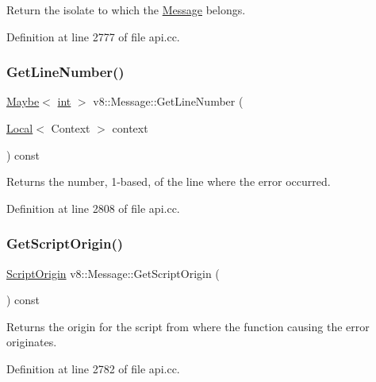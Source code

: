 Return the isolate to which the \mbox{\hyperlink{classv8_1_1Message}{Message}} belongs. 

Definition at line 2777 of file api.\+cc.

\mbox{\label{classv8_1_1Message_aa274b764af674e656346c42d15aac691}} 
\subsubsection{\texorpdfstring{Get\+Line\+Number()}{GetLineNumber()}}
{\footnotesize\ttfamily \mbox{\hyperlink{classv8_1_1Maybe}{Maybe}}$<$ \mbox{\hyperlink{classint}{int}} $>$ v8\+::\+Message\+::\+Get\+Line\+Number (\begin{DoxyParamCaption}\item[{\mbox{\hyperlink{classv8_1_1Local}{Local}}$<$ Context $>$}]{context }\end{DoxyParamCaption}) const}

Returns the number, 1-\/based, of the line where the error occurred. 

Definition at line 2808 of file api.\+cc.

\mbox{\label{classv8_1_1Message_a3530ffb45b802c46a47349e610402a3c}} 
\subsubsection{\texorpdfstring{Get\+Script\+Origin()}{GetScriptOrigin()}}
{\footnotesize\ttfamily \mbox{\hyperlink{classv8_1_1ScriptOrigin}{Script\+Origin}} v8\+::\+Message\+::\+Get\+Script\+Origin (\begin{DoxyParamCaption}{ }\end{DoxyParamCaption}) const}

Returns the origin for the script from where the function causing the error originates. 

Definition at line 2782 of file api.\+cc.

\mbox{\label{classv8_1_1Message_ad6c8411095f39ec6022d880c9cbbc870}} 
